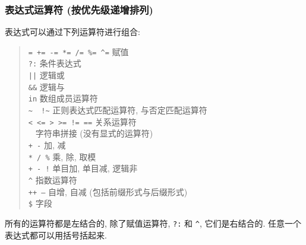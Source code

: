 \subsubsection{表达式运算符 (按优先级递增排列)}
表达式可以通过下列运算符进行组合:
\begin{quote}
    \begin{tabbing}
        \verb'= += -= *= /= %= ^=' \hspace{2em} \= 赋值 \\

        \texttt{?:} \> 条件表达式 \\

        \texttt{||} \> 逻辑或 \\

        \verb'&&' \> 逻辑与 \\

        \texttt{in} \> 数组成员运算符 \\

        \verb'~  !~' \> 正则表达式匹配运算符, 与否定匹配运算符 \\

        \texttt{< <= > >= != ==} \> 关系运算符 \\

        \texttt{ }      \> 字符串拼接 (没有显式的运算符) \\

        \texttt{+ -}    \> 加, 减 \\

        \verb'* / %'  \> 乘, 除, 取模 \\

        \texttt{+ - !}  \> 单目加, 单目减, 逻辑非 \\

        \texttt{\^}      \> 指数运算符 \\

        \texttt{++ --}  \> 自增, 自减 (包括前缀形式与后缀形式) \\

        \texttt{\$}     \> 字段 \\
    \end{tabbing}
\end{quote}
所有的运算符都是左结合的, 除了赋值运算符, \texttt{?:} 和 \texttt{\^},
它们是右结合的. 任意一个表达式都可以用括号括起来.
